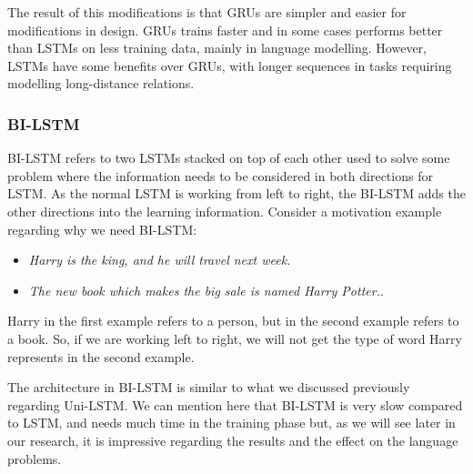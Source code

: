 The result of this modifications is that GRUs are simpler and easier for modifications in design. GRUs trains faster and in some cases performs better than LSTMs on less training data, mainly in language modelling. However, LSTMs have some benefits over GRUs, with longer sequences in tasks requiring modelling long-distance relations.

\subsubsection{BI-LSTM}\label{Sec:Bi_Lstm}

BI-LSTM refers to two LSTMs stacked on top of each other used to solve some problem where the information needs to be considered in both directions for LSTM. As the normal LSTM is working from left to right, the BI-LSTM adds the other directions into the learning information. Consider a motivation example regarding why we need BI-LSTM:

\begin{itemize}
\item \textit{Harry is the king, and he will travel next week.}
\item \textit{The new book which makes the big sale is named Harry Potter.}.
\end{itemize}

Harry in the first example refers to a person, but in the second example refers to a book. So, if we are working left to right, we will not get the type of word Harry represents in the second example.

The architecture in BI-LSTM is similar to what we discussed previously regarding Uni-LSTM. We can mention here that BI-LSTM is very slow compared to LSTM, and needs much time in the training phase but, as we will see later in our research, it is impressive regarding the results and the effect on the language problems.

